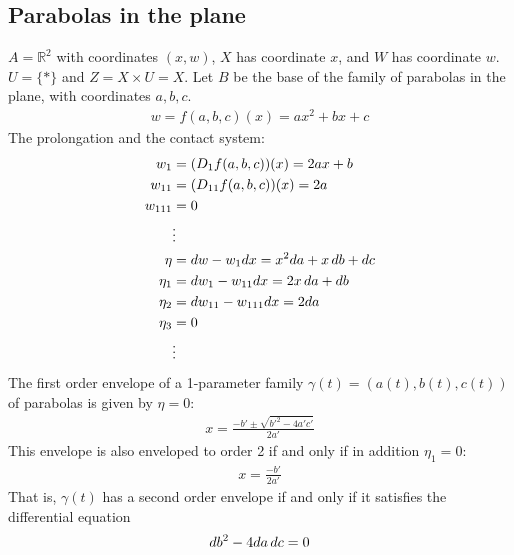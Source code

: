 \documentclass[12pt]{article}
\numberwithin{equation}{section}
\theoremstyle{plain}
\theoremstyle{definition}
\newcommand{\R}{\mathbb{R}}
\begin{document}
\subsection{Parabolas in the plane} $A=\R^{2}$ with coordinates $(x,w)$, $X$ has coordinate $x$, and $W$ has coordinate $w$. $U=\{*\}$ and $Z=X\times U=X$. Let $B$ be the base of the family of parabolas in the plane, with coordinates $a,b,c$.
\begin{align*}
w=f(a,b,c)(x)=ax^{2}+bx+c
\end{align*}
The prolongation and the contact system:
\begin{align*}
w_{1}&=(D_{1}f(a,b,c))(x)=2ax+b\\
w_{11}&=(D_{11}f(a,b,c))(x)=2a\\
w_{111}&=0\\
&\vdots\\
\eta&=dw-w_{1}dx=x^{2}da+x\thinspace db+dc\\
\eta_{1}&=dw_{1}-w_{11}dx=2x\thinspace da +db\\
\eta_{2}&=dw_{11}-w_{111}dx=2da\\
\eta_{3}&=0\\
&\vdots
\end{align*}
The first order envelope of a 1-parameter family $\gamma(t)=(a(t),b(t),c(t))$ of parabolas is given by $\eta=0$:
\begin{align*}
x=\frac{-b'\pm\sqrt{b'^{2}-4a'c'}}{2a'}
\end{align*}
This envelope is also enveloped to order 2 if and only if in addition $\eta_{1}=0$:
\begin{align*}
x=\frac{-b'}{2a'}
\end{align*}
That is, $\gamma(t)$ has a second order envelope if and only if it satisfies the differential equation
\begin{align*}
db^{2}-4da\thinspace dc=0
\end{align*}
\end{document}
